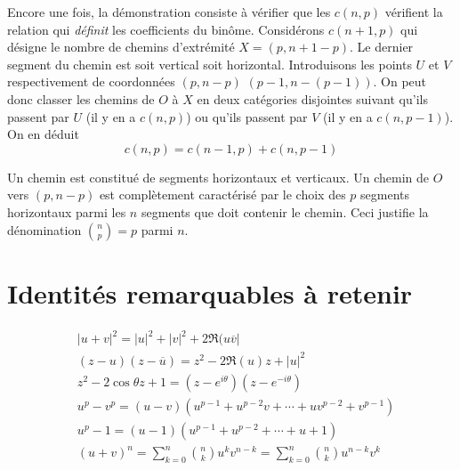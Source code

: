 \begin{demo}
  Encore une fois, la démonstration consiste à vérifier que les $c(n,p)$ vérifient la relation qui \emph{définit} les coefficients du binôme.\newline
  Considérons $c(n+1,p)$ qui désigne le nombre de chemins d'extrémité $X=(p,n+1-p)$. Le dernier segment du chemin est soit vertical soit horizontal. Introduisons les points $U$ et $V$ respectivement de coordonnées $(p,n-p)$ $(p-1,n-(p-1))$. On peut donc classer les chemins de $O$ à $X$ en deux catégories disjointes suivant qu'ils passent par $U$ (il y en a $c(n,p)$) ou qu'ils passent par $V$ (il y en a $c(n,p-1)$). On en déduit
  \begin{displaymath}
    c(n,p) = c(n-1,p) + c(n,p-1)
  \end{displaymath}
\end{demo}
Un chemin est constitué de segments horizontaux et verticaux. Un chemin de $O$ vers $(p,n-p)$ est complètement caractérisé par le choix des $p$ segments horizontaux parmi les $n$ segments que doit contenir le chemin. Ceci justifie la dénomination $\binom{n}{p} =$\og $p$ parmi $n$\fg.

\section{Identités remarquables à retenir}

\begin{align*}
  &|u+v|^2 = |u|^2 + |v|^2 + 2\Re(u \overline{v}|\\
  &(z-u)(z-\overline{u})  = z^2 - 2\Re(u) z + |u|^2 \\
  &z^2 -2\cos \theta z + 1 = (z-e^{i\theta})(z-e^{-i\theta})\\
  &u^p - v^p = (u-v)(u^{p-1} + u^{p-2}v + \cdots + uv^{p-2} + v^{p-1}) \\
  &u^p - 1 = (u-1)(u^{p-1} + u^{p-2}+\cdots + u +1) \\
  &(u+v)^n = \sum _{k=0}^n \binom{n}{k}u^k v^{n-k}= \sum _{k=0}^n \binom{n}{k}u^{n-k} v^{k}
\end{align*}


